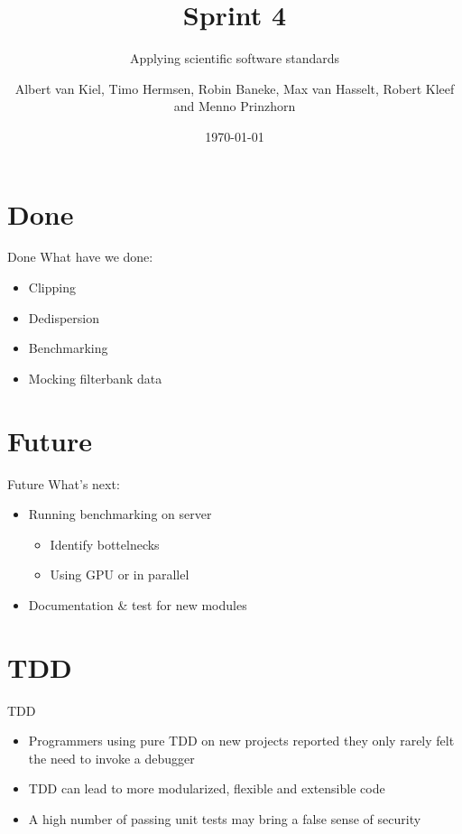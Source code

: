 \documentclass{beamer}
\title{Sprint 4}
\subtitle{Applying scientific software standards}
\author{Albert van Kiel, Timo Hermsen, Robin Baneke, Max van Hasselt, Robert Kleef and Menno Prinzhorn}
\date{\today}
\begin{document}
    
    \begin{frame}
        \titlepage
    \end{frame}
    
    \section{Done}

    \begin{frame}{Done}
        What have we done:
        \begin{itemize}
            \item Clipping
            \item Dedispersion
            \item Benchmarking
            \item Mocking filterbank data
        \end{itemize}
    \end{frame}
    
    \section{Future}
    
    \begin{frame}{Future}
        What's next:       
        \begin{itemize}
            \item Running benchmarking on server
            \begin{itemize}
                \item Identify bottelnecks
                \item Using GPU or in parallel
            \end{itemize}
            \item Documentation \& test for new modules
        \end{itemize}
    \end{frame}

    \section{TDD}

    \begin{frame}{TDD}
        \begin{itemize}
            \item Programmers using pure TDD on new projects reported they only rarely felt the need to invoke a debugger
            \item TDD can lead to more modularized, flexible and extensible code
            \item A high number of passing unit tests may bring a false sense of security
        \end{itemize}
    \end{frame}
\end{document}
